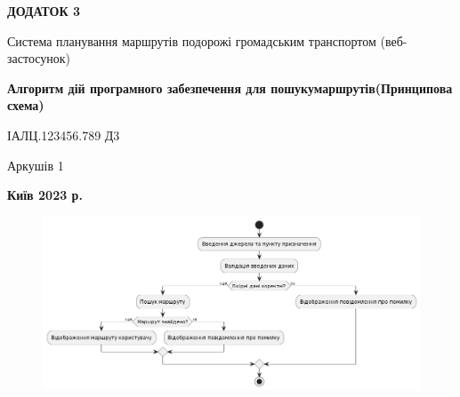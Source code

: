 \clearpage
\begin{center}
{\fontsize{18}{22}\selectfont
\textbf{\uppercase{Додаток 3}}
}

{\fontsize{16}{29}\selectfont
\bigbreak
\bigbreak
Система планування маршрутів подорожі громадським транспортом (веб-
застосунок)
}

\vspace*{\fill}

{\fontsize{18}{22}\selectfont
\textbf{Алгоритм дій програмного забезпечення для пошукумаршрутів(Принципова схема)}

ІАЛЦ.123456.789 Д3
}

\vfill

{\fontsize{16}{29}\selectfont
Аркушів 1
}
\vfill %

\textbf{Київ 2023 р.}
\end{center}
\clearpage

\vspace*{\fill}
\begin{figure}[!htp]
    \centering
    \includegraphics[scale=0.5]{content/applications/assets/img/route_search_diagram.png}
    \label{fig:app-3}
\end{figure}
\vfill